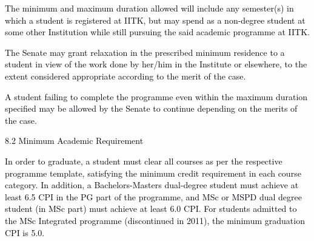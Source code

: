 \documentclass[12pt]{article}
\begin{document}


\vspace{\baselineskip}
\begin{justify}
{\fontsize{9pt}{10.8pt}\selectfont \textcolor[HTML]{00000A}{The minimum and maximum duration allowed will include any semester(s) in which a student is registered at IITK, but may spend as a non-degree student at some other Institution while still pursuing the said academic programme at IITK.}\par}
\end{justify}\par


\vspace{\baselineskip}
\begin{adjustwidth}{0.0in}{0.01in}
\begin{justify}
{\fontsize{10pt}{12.0pt}\selectfont \textcolor[HTML]{00000A}{The Senate may grant relaxation in the prescribed minimum residence to a student in view of the work done by her/him in the Institute or elsewhere, to the extent considered appropriate according to the merit of the case.}\par}
\end{justify}\par

\end{adjustwidth}


\vspace{\baselineskip}
\begin{justify}
{\fontsize{10pt}{12.0pt}\selectfont \textcolor[HTML]{00000A}{A student failing to complete the programme even within the maximum duration specified may be allowed by the Senate to continue depending on the merits of the case.}\par}
\end{justify}\par


\vspace{\baselineskip}
\textcolor[HTML]{00000A}{8.2 Minimum Academic Requirement}\par


\vspace{\baselineskip}
\begin{justify}
{\fontsize{9pt}{10.8pt}\selectfont \textcolor[HTML]{00000A}{In order to graduate, a student must clear all courses as per the respective programme template, satisfying the minimum credit requirement in each course category. In addition, a Bachelors-Masters dual-degree student must achieve at least 6.5 CPI in the PG part of the programme, and MSc or MSPD dual degree student (in MSc part) must achieve at least 6.0 CPI. For students admitted to the MSc Integrated programme (discontinued in 2011), the minimum graduation CPI is 5.0.}\par}
\end{justify}\par
\end{document}

